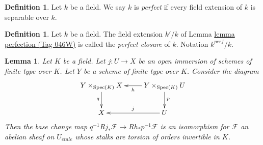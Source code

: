 \documentclass{amsart}
\theoremstyle{plain}
\newtheorem{lemma}[subsection]{Lemma}
\theoremstyle{definition}
\newtheorem{definition}[subsection]{Definition}
\theoremstyle{remark}
\numberwithin{equation}{subsection}
\def\Spec{\mathop{\mathrm{Spec}}}
\def\etale{{\acute{e}tale}}
\begin{document}
\begin{definition}
\label{algebra-definition-perfect}
Let $k$ be a field. We say $k$ is {\it perfect}
if every field extension of $k$ is separable over $k$.
\end{definition}

\begin{definition}
\label{algebra-definition-perfection}
Let $k$ be a field. The field extension $k'/k$ of Lemma \href{https://stacks.math.columbia.edu/tag/046W}{lemma perfection (Tag 046W)}
is called the {\it perfect closure} of $k$. Notation $k^{perf}/k$.
\end{definition}

\begin{lemma}
\label{lemma-kunneth-localize-on-X}
Let $K$ be a field. Let $j : U \to X$ be an open immersion of
schemes of finite type over $K$. Let $Y$ be a scheme of finite type
over $K$. Consider the diagram
$$
\xymatrix{
Y \times_{\Spec(K)} X \ar[d]_q  &
Y \times_{\Spec(K)} U \ar[l]^h \ar[d]^p \\
X & U \ar[l]_j
}
$$
Then the base change map $q^{-1}Rj_*\mathcal{F} \to Rh_*p^{-1}\mathcal{F}$
is an isomorphism for $\mathcal{F}$ an abelian sheaf on $U_\etale$
whose stalks are torsion of orders invertible in $K$.
\end{lemma}
\end{document}
